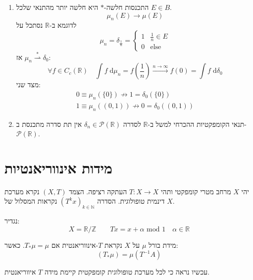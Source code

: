 \documentclass{tstextbook}
\begin{document}
\begin{remark}
  \begin{enumerate}
    \item התכנסות חלשה-\(*\) היא חלשה יותר מהתנאי שלכל \(E \in B\). 
$$\mu_{n}(E)\to \mu(E)$$
לדוגמא ב-\(\mathbb{R}\) נסתכל על 
$$\mu_{n}=\delta_{\frac{1}{n}} = \begin{cases} 1  &  \frac{1}{n}\in E \\0 & \text{else}
\end{cases}$$
אז \(\mu_{n}\overset{*}{\rightharpoonup} \delta_{0}\):
$$\forall f \in C_{c}\left( \mathbb{R} \right)\quad \int f \;\mathrm{d} \mu_{n}= f\left(  \frac{1}{n} \right)\xrightarrow{n\to \infty}f(0)=\int f \;\mathrm{d} \delta_{0}  $$
מצד שני:
\begin{gather*}0\equiv \mu_{n}\left( \{ 0 \} \right) \not \to 1 = \delta_{0}\left( \{ 0 \} \right)  \\1\equiv \mu_{n}((0,1)) \not \to 0 =\delta_{0}((0,1))
\end{gather*}


    \item תנאי הקומפקטיות ההכרחי למשל ב-\(\mathbb{R}\) לסדרה \(\delta_{n} \in \mathcal{P}\left( \mathbb{R} \right)\) אין תת סדרה מתכנסת ב-\(\mathcal{P}\left( \mathbb{R} \right)\). 


  \end{enumerate}
\end{remark}
\section{מידות אינווריאנטיות}

יהי \(X\) מרחב מטרי קומפקטי ותהי \(T:X \to X\) העתקה רציפה. הצמד \((X,T)\) נקרא מערכת דינמית טופולוגית. הסדרה \((T^{k}x)_{k \in \mathbb{N}}\) נקראות המסלול של \(X\).

\begin{example}
נגדיר:
$$X=\mathbb{R} / \mathbb{Z} \qquad  Tx = x+\alpha \text{ mod }1 \quad  \alpha \in \mathbb{R}$$

\end{example}
\begin{definition}
מידת בורל \(\mu\) על \(X\) נקראת \(T\)-אינווריאנטית אם \(T_{*}\mu = \mu\). כאשר:
$$\left( T_{*}\mu \right)=\mu(T^{-1}A)$$

\end{definition}
עכשיו נראה כי לכל מערכת טופולוגית קומפקטית קיימת מידה \(T\) איווריאנטית.
\end{document}
